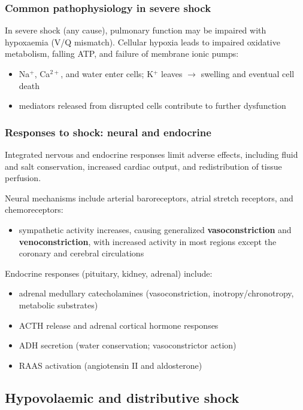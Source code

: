 \documentclass[11pt,a4paper]{article}
\begin{document}
\subsubsection{Common pathophysiology in severe shock}
In severe shock (any cause), pulmonary function may be impaired with hypoxaemia (V/Q mismatch). Cellular hypoxia leads to impaired oxidative metabolism, falling ATP, and failure of membrane ionic pumps:
\begin{itemize}
\item Na$^+$, Ca$^{2+}$, and water enter cells; K$^+$ leaves $\rightarrow$ swelling and eventual cell death
\item mediators released from disrupted cells contribute to further dysfunction
\end{itemize}

\subsubsection{Responses to shock: neural and endocrine}
Integrated nervous and endocrine responses limit adverse effects, including fluid and salt conservation, increased cardiac output, and redistribution of tissue perfusion.

Neural mechanisms include arterial baroreceptors, atrial stretch receptors, and chemoreceptors:
\begin{itemize}
\item sympathetic activity increases, causing generalized \textbf{vasoconstriction} and \textbf{venoconstriction}, with increased activity in most regions except the coronary and cerebral circulations
\end{itemize}

Endocrine responses (pituitary, kidney, adrenal) include:
\begin{itemize}
\item adrenal medullary catecholamines (vasoconstriction, inotropy/chronotropy, metabolic substrates)
\item ACTH release and adrenal cortical hormone responses
\item ADH secretion (water conservation; vasoconstrictor action)
\item RAAS activation (angiotensin II and aldosterone)
\end{itemize}

\subsection{Hypovolaemic and distributive shock}
\end{document}
